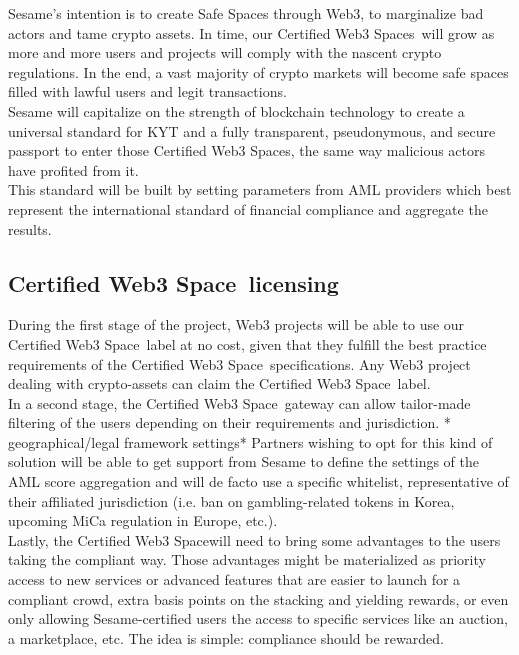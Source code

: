 ﻿\documentclass[a4paper]{article}
\begin{document}
Sesame’s intention is to create Safe Spaces through Web3, to marginalize bad actors and tame crypto assets. In time, our Certified Web3 Spaces\texttrademark\ will grow as more and more users and projects will comply with the nascent crypto regulations. In the end, a vast majority of crypto markets will become safe spaces filled with lawful users and legit transactions. \\

Sesame will capitalize on the strength of blockchain technology to create a universal standard for KYT and a fully transparent, pseudonymous, and secure passport to enter those Certified Web3 Spaces\texttrademark, the same way malicious actors have profited from it. \\

This standard will be built by setting parameters from AML providers which best represent the international standard of financial compliance and aggregate the results.

\subsection{Certified Web3 Space\texttrademark\ licensing}
During the first stage of the project, Web3 projects will be able to use our Certified Web3 Space\texttrademark\ label at no cost, given that they fulfill the best practice requirements of the Certified Web3 Space\texttrademark\ specifications. Any Web3 project dealing with crypto-assets can claim the Certified Web3 Space\texttrademark\ label. \\

In a second stage, the Certified Web3 Space\texttrademark\ gateway can allow tailor-made filtering of the users depending on their requirements and jurisdiction. * geographical/legal framework settings* Partners wishing to opt for this kind of solution will be able to get support from Sesame to define the settings of the AML score aggregation and will de facto use a specific whitelist, representative of their affiliated jurisdiction (i.e. ban on gambling-related tokens in Korea, upcoming MiCa regulation in Europe, etc.). \\

Lastly, the Certified Web3 Space\texttrademark will need to bring some advantages to the users taking the compliant way. Those advantages might be materialized as priority access to new services or advanced features that are easier to launch for a compliant crowd, extra basis points on the stacking and yielding rewards, or even only allowing Sesame-certified users the access to specific services like an auction, a marketplace, etc. The idea is simple: compliance should be rewarded. 
\end{document}
